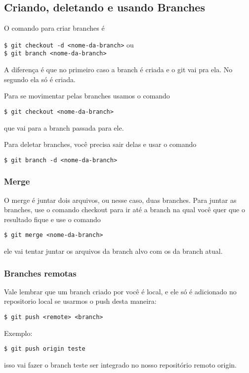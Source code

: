 \documentclass{article}
\begin{document}
\subsection{Criando, deletando e usando Branches}
    O comando para criar branches é
\begin{tabbing}
    \hspace{1cm}\=\verb#$ git checkout -d <nome-da-branch># ou\\
                \>\verb#$ git branch <nome-da-branch>#
\end{tabbing}
    A diferença é que no primeiro caso a branch é criada e o git vai pra ela. No segundo
ela só é criada.

    Para se movimentar pelas branches usamos o comando
\begin{tabbing}
    \hspace{1cm}\=\verb#$ git checkout <nome-da-branch>#
\end{tabbing}
    que vai para a branch passada para ele.

    Para deletar branches, você precisa sair delas e usar o comando
\begin{tabbing}
    \hspace{1cm}\=\verb#$ git branch -d <nome-da-branch>#
\end{tabbing}

\subsubsection{Merge}
    O merge é juntar dois arquivos, ou nesse caso, duas branches. Para juntar as
branches, use o comando checkout para ir até a branch na qual você quer que o resultado
fique e use o comando 
\begin{tabbing}
    \hspace{1cm}\=\verb#$ git merge <nome-da-branch>#
\end{tabbing}
ele vai tentar juntar os arquivos da branch alvo com os da branch atual.


\subsubsection{Branches remotas}

Vale lembrar que um branch criado por você é local, e ele só é adicionado no repositorio 
local se usarmos o push desta maneira:
\begin{tabbing}
    \hspace{1cm}\=\verb#$ git push <remote> <branch>#\\
\end{tabbing} 
Exemplo: 
\begin{tabbing}
    \hspace{1cm}\=\verb#$ git push origin teste#\\
\end{tabbing} 
isso vai fazer o branch teste ser integrado no nosso repositório remoto origin.
\end{document}
